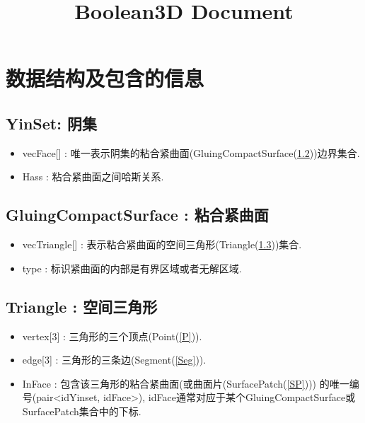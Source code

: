 \documentclass[a4paper]{book}
\makeatletter
\newcommand{\voidenvironment}[1]{%
\expandafter\providecommand\csname env@#1@save@env\endcsname{}%
\expandafter\providecommand\csname env@#1@process\endcsname{}%
\@ifundefined{#1}{}{\RenewEnviron{#1}{}}%
}
\numberwithin{equation}{chapter}
\theoremstyle{definition}
\makeatother
\begin{document}
\pagestyle{empty}




\setcounter{chapter}{0}




\title{Boolean3D Document}
\chapter{数据结构及包含的信息}
\section{YinSet: 阴集}\label{YS}
\begin{itemize}
    \item vecFace[] : 唯一表示阴集的粘合紧曲面(GluingCompactSurface(\ref{GCS}))边界集合.
    \item Hass : 粘合紧曲面之间哈斯关系.
\end{itemize}

\section{GluingCompactSurface : 粘合紧曲面}\label{GCS}
\begin{itemize}
    \item vecTriangle[] : 表示粘合紧曲面的空间三角形(Triangle(\ref{Tri}))集合.
    \item type : 标识紧曲面的内部是有界区域或者无解区域.
\end{itemize}


\section{Triangle : 空间三角形}\label{Tri}
\begin{itemize}
    \item vertex[3] : 三角形的三个顶点(Point(\ref{P})).
    \item edge[3] : 三角形的三条边(Segment(\ref{Seg})).
    \item InFace : 包含该三角形的粘合紧曲面(或曲面片(SurfacePatch(\ref{SP})))
    的唯一编号(pair<idYinset, idFace>),
     idFace通常对应于某个GluingCompactSurface或SurfacePatch集合中的下标.
\end{itemize}
\end{document}
